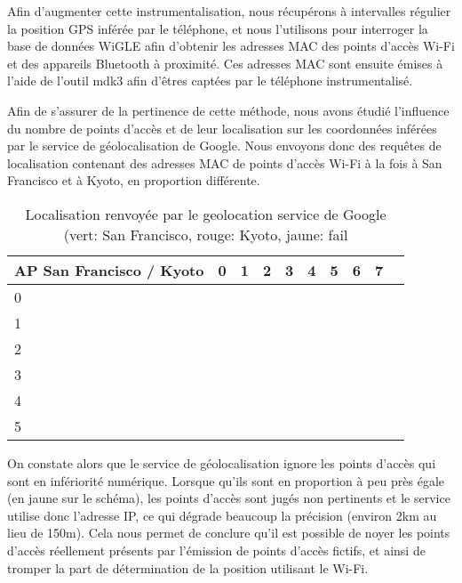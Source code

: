 \documentclass[runningheads]{llncs}
\begin{document}
Afin d'augmenter cette instrumentalisation, nous récupérons à intervalles régulier la position GPS inférée par le téléphone, et nous l'utilisons pour interroger la base de données WiGLE afin d'obtenir les adresses MAC des points d'accès Wi-Fi et des appareils Bluetooth à proximité. Ces adresses MAC sont ensuite émises à l'aide de l'outil mdk3\cite{aspj_mdk3_2013} afin d'êtres captées par le téléphone instrumentalisé.

Afin de s'assurer de la pertinence de cette méthode, nous avons étudié l'influence du nombre de points d'accès et de leur localisation sur les coordonnées inférées par le service de géolocalisation de Google. Nous envoyons donc des requêtes de localisation contenant des adresses MAC de points d'accès Wi-Fi à la fois à San Francisco et à Kyoto, en proportion différente.

\newcommand{\green}{\cellcolor{green!50}}
\newcommand{\red}{\cellcolor{red!50}}
\newcommand{\yellow}{\cellcolor{yellow!80}}
\begin{table}
\centering
\begin{tabular} {| m{4.5cm} | m{0.6cm}| m{0.6cm} | m{0.6cm} | m{0.6cm} | m{0.6cm} | m{0.6cm} | m{0.6cm} | m{0.6cm} | m{0.6cm} |}
 \hline
 AP San Francisco / Kyoto & 0 & 1 & 2 & 3 & 4 & 5 & 6 & 7   \\
 \hline
 0  & \cellcolor{black} & \red & \red & \red & \red & \red & \red & \red     \\
 \hline
 1 & \green & \yellow & \yellow & \red & \red & \red & \red & \red  \\
 \hline
 2 & \green & \green & \green & \yellow & \red & \red & \red & \red  \\
 \hline
 3 & \green & \green & \green & \green & \yellow & \red & \red & \red  \\
 \hline
 4 & \green & \green & \green & \green & \green & \yellow & \yellow & \red  \\
 \hline
 5 & \green & \green & \green & \green & \green & \green & \green & \yellow  \\
 \hline
\end{tabular} 
\vspace{10pt}
\caption{\label{tab:table-name} Localisation renvoyée par le geolocation service de Google (vert: San Francisco, rouge: Kyoto, jaune: fail}
\end{table}

On constate alors que le service de géolocalisation ignore les points d'accès qui sont en infériorité numérique. Lorsque qu'ils sont en proportion à peu près égale (en jaune sur le schéma), les points d'accès sont jugés non pertinents et le service utilise donc l'adresse IP, ce qui dégrade beaucoup la précision (environ 2km au lieu de 150m). Cela nous permet de conclure qu'il est possible de noyer les points d'accès réellement présents par l'émission de points d'accès fictifs, et ainsi de tromper la part de détermination de la position utilisant le Wi-Fi. 
\end{document}
